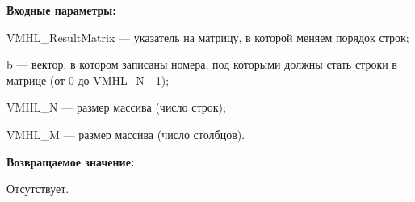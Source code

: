 \textbf{Входные параметры:}
 
VMHL\_ResultMatrix --- указатель на матрицу, в которой меняем порядок строк;
 
b --- вектор, в котором записаны номера, под которыми должны стать строки в матрице (от 0 до VMHL\_N---1);
 
VMHL\_N --- размер массива (число строк);
 
VMHL\_M --- размер массива (число столбцов).

\textbf{Возвращаемое значение:}

Отсутствует.